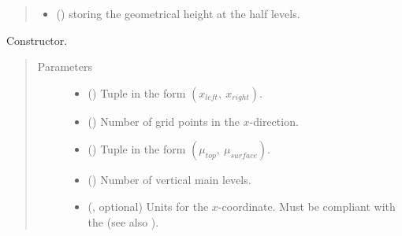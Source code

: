 \documentclass[letterpaper,10pt,english]{sphinxmanual}
\begin{document}
\begin{fulllineitems}
\begin{quote}
\begin{description}
\begin{itemize}
\item {} 
 () \textendash{}  storing the geometrical
height at the half levels.

\end{itemize}

\end{description}\end{quote}

\begin{fulllineitems}
\label{\detokenize{api:grids.gal_chen.GalChen2d.__init__}}
Constructor.
\begin{quote}\begin{description}
\item[{Parameters}] \leavevmode\begin{itemize}
\item {} 
 () \textendash{} Tuple in the form \((x_{left}, ~ x_{right})\).

\item {} 
 () \textendash{} Number of grid points in the \(x\)-direction.

\item {} 
 () \textendash{} Tuple in the form \((\mu_{top}, ~ \mu_{surface})\).

\item {} 
 () \textendash{} Number of vertical main levels.

\item {} 
 (, optional) \textendash{} 
Units for the \(x\)-coordinate. Must be compliant
with the  (see also
{\hyperref[\detokenize{api:grids.axis.Axis.__init__}]{}}).



\end{itemize}
\end{description}
\end{quote}
\end{fulllineitems}
\end{fulllineitems}
\end{document}
